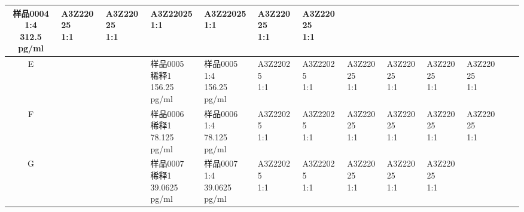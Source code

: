 \documentclass[UTF8,10pt,a4paper,fontset=fandol]{ctexart}
\begin{document}
\begin{center}
\begin{tabular}{c|*{12}{p{0.58cm}|}}
\shortstack{样品0004\\1:4\\312.5 pg/ml} &
\shortstack{A3Z22025\\1:1} &
\shortstack{A3Z22025\\1:1} &
\shortstack{A3Z22025\\1:1} &
\shortstack{A3Z22025\\1:1} &
\shortstack{A3Z22025\\1:1} &
\shortstack{A3Z22025\\1:1} &
 & \\
\hline
E &
 & &
\shortstack{样品0005\\稀释1\\156.25 pg/ml} &
\shortstack{样品0005\\1:4\\156.25 pg/ml} &
\shortstack{A3Z22025\\1:1} &
\shortstack{A3Z22025\\1:1} &
\shortstack{A3Z22025\\1:1} &
\shortstack{A3Z22025\\1:1} &
\shortstack{A3Z22025\\1:1} &
\shortstack{A3Z22025\\1:1} &
 & \\
\hline
F &
 & &
\shortstack{样品0006\\稀释1\\78.125 pg/ml} &
\shortstack{样品0006\\1:4\\78.125 pg/ml} &
\shortstack{A3Z22025\\1:1} &
\shortstack{A3Z22025\\1:1} &
\shortstack{A3Z22025\\1:1} &
\shortstack{A3Z22025\\1:1} &
\shortstack{A3Z22025\\1:1} &
\shortstack{A3Z22025\\1:1} &
 & \\
\hline
G &
 & &
\shortstack{样品0007\\稀释1\\39.0625 pg/ml} &
\shortstack{样品0007\\1:4\\39.0625 pg/ml} &
\shortstack{A3Z22025\\1:1} &
\shortstack{A3Z22025\\1:1} &
\shortstack{A3Z22025\\1:1} &
\shortstack{A3Z22025\\1:1} &
\shortstack{A3Z22025\\1:1} &

\end{tabular}
\end{center}
\end{document}
